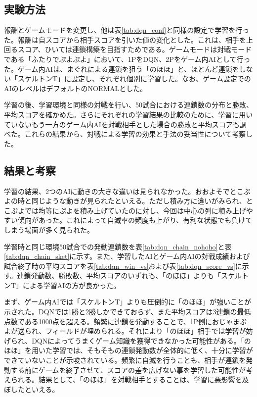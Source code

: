\documentclass[12pt]{jreport}
\begin{document}
\subsection{実験方法}
報酬とゲームモードを変更し、他は表\ref{tab:dqn_conf}と同様の設定で学習を行った。報酬は自スコアから相手スコアを引いた値の変化とした。これは、相手を上回るスコア、ひいては連鎖構築を目指すためである。ゲームモードは対戦モードである「ふたりでぷよぷよ」において、1PをDQN、2Pをゲーム内AIとして行った。ゲーム内AIは、まぐれによる連鎖を狙う「のほほ」と、ほとんど連鎖をしない「スケルトンT」に設定し、それぞれ個別に学習した。なお、ゲーム設定でのAIのレベルはデフォルトのNORMALとした。

学習の後、学習環境と同様の対戦を行い、50試合における連鎖数の分布と勝敗、平均スコアを確かめた。さらにそれぞれの学習結果の比較のために、学習に用いていないもう一方のゲーム内AIを対戦相手とした場合の勝敗と平均スコアも調べた。これらの結果から、対戦による学習の効果と手法の妥当性について考察した。

\subsection{結果と考察}
学習の結果、2つのAIに動きの大きな違いは見られなかった。おおよそでとこぷよの時と同じような動きが見られたといえる。ただし積み方に違いがみられ、とこぷよでは均等にぷよを積み上げていたのに対し、今回は中心の列に積み上げやすい傾向があった。これによって自滅率の頻度も上がり、有利な状態でも負けてしまう場面が多く見られた。

学習時と同じ環境50試合での発動連鎖数を表\ref{tab:dqn_chain_nohoho}と表\ref{tab:dqn_chain_sket}に示す。また、学習したAIとゲーム内AIの対戦成績および試合終了時の平均スコアを表\ref{tab:dqn_win_vs}および表\ref{tab:dqn_score_vs}に示す。連鎖発動数、勝敗数、平均スコアのいずれも、「のほほ」よりも「スケルトンT」による学習AIの方が良かった。

まず、ゲーム内AIでは「スケルトンT」よりも圧倒的に「のほほ」が強いことが示された。DQNでは1勝と2勝しかできておらず、また平均スコアは3連鎖の最低点数である1000点を超える。頻繁に連鎖を発動することで、1P側におじゃまぷよが送られ、フィールドが埋められる。それにより「のほほ」相手では学習が妨げられ、DQNによってうまくゲーム知識を獲得できなかった可能性がある。「のほほ」を用いた学習では、そもそもの連鎖発動数が全体的に低く、十分に学習ができていないことが示唆されている。頻繁に自滅を行うことも、相手が連鎖を発動する前にゲームを終了させて、スコアの差を広げない事を学習した可能性が考えられる。結果として、「のほほ」を対戦相手とすることは、学習に悪影響を及ぼしたといえる。
\end{document}
